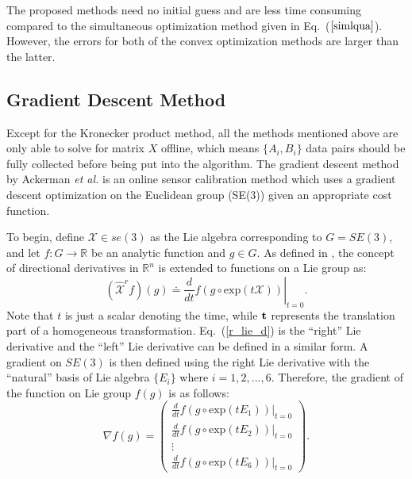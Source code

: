 \documentclass[twocolumn,10pt]{asme2ej}
\newcommand{\ttt}{{\bf t}}
\begin{document}
The proposed methods need no initial guess and are less time consuming compared to the simultaneous optimization method given in Eq.~($\ref{simlqua}$). However, the errors for both of the convex optimization methods are larger than the latter. 
\subsection{Gradient Descent Method}
Except for the Kronecker product method, all the methods mentioned above are only able to solve for matrix $X$ offline, which means $\{A_{i}, B_{i}\}$ data pairs should be fully collected before being put into the algorithm. The gradient descent method \cite{ackerman2014online} by Ackerman {\it et al.} is an online sensor calibration method which uses a gradient descent optimization on the Euclidean group (SE(3)) given an appropriate cost function. 

To begin, define $\mathcal{X} \in se(3)$ as the Lie algebra corresponding to $G = SE(3)$, and let $f:G \rightarrow \mathbb{R}$ be an analytic function and $g \in G$. As defined in \cite{myoldbook}, the concept of directional derivatives in $\mathbb{R}^{n}$ is extended to functions on a Lie group as:
\begin{equation}
\left.(\hat{\mathcal{X}}^{r}f)(g)\doteq \dfrac{d}{dt}f(g\circ \text{exp}(t\mathcal{X}))\right\vert_{t=0}.
\label{r_lie_d}
\end{equation}
Note that $t$ is just a scalar denoting the time, while $\ttt$ represents the translation part of a homogeneous transformation.
Eq.~(\ref{r_lie_d}) is the ``right'' Lie derivative and the ``left'' Lie derivative can be defined in a similar form. A gradient on $SE(3)$ is then defined using the right Lie derivative with the ``natural'' basis of Lie algebra $\{E_{i}\}$ where $i = 1,2,...,6$. Therefore, the gradient of the function on Lie group $f(g)$ is as follows:
\begin{equation}
\nabla f(g)= \left( 
\begin{matrix}
\frac{d}{dt}\left.f(g\circ \text{exp}(tE_{1}))\right\vert _{t=0} \\
\frac{d}{dt}\left.f(g\circ \text{exp}(tE_{2}))\right\vert _{t=0} \\
\vdots \\
\frac{d}{dt}\left.f(g\circ \text{exp}(tE_{6}))\right\vert _{t=0}
\end{matrix}
\right).
\end{equation}
\end{document}
